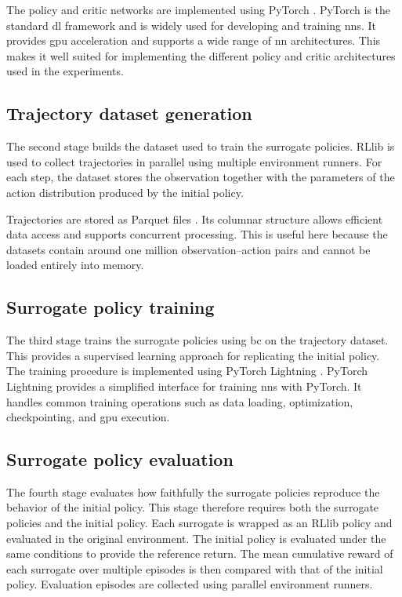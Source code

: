 The policy and critic networks are implemented using PyTorch \parencite{paszke2019pytorch}.
PyTorch is the standard \gls{dl} framework and is widely used for developing and training \glspl{nn}.
It provides \gls{gpu} acceleration and supports a wide range of \gls{nn} architectures.
This makes it well suited for implementing the different policy and critic architectures used in the experiments.

\subsection{Trajectory dataset generation}

The second stage builds the dataset used to train the surrogate policies.
RLlib is used to collect trajectories in parallel using multiple environment runners.
For each step, the dataset stores the observation together with the parameters of the action distribution produced by the initial policy.

Trajectories are stored as Parquet files \parencite{arrow}.
Its columnar structure allows efficient data access and supports concurrent processing.
This is useful here because the datasets contain around one million observation--action pairs and cannot be loaded entirely into memory.

\subsection{Surrogate policy training}

The third stage trains the surrogate policies using \gls{bc} on the trajectory dataset.
This provides a supervised learning approach for replicating the initial policy.
The training procedure is implemented using PyTorch Lightning \parencite{falcon2019lightning}.
PyTorch Lightning provides a simplified interface for training \glspl{nn} with PyTorch.
It handles common training operations such as data loading, optimization, checkpointing, and \gls{gpu} execution.

\subsection{Surrogate policy evaluation}

The fourth stage evaluates how faithfully the surrogate policies reproduce the behavior of the initial policy.
This stage therefore requires both the surrogate policies and the initial policy.
Each surrogate is wrapped as an RLlib policy and evaluated in the original environment.
The initial policy is evaluated under the same conditions to provide the reference return.
The mean cumulative reward of each surrogate over multiple episodes is then compared with that of the initial policy.
Evaluation episodes are collected using parallel environment runners.

